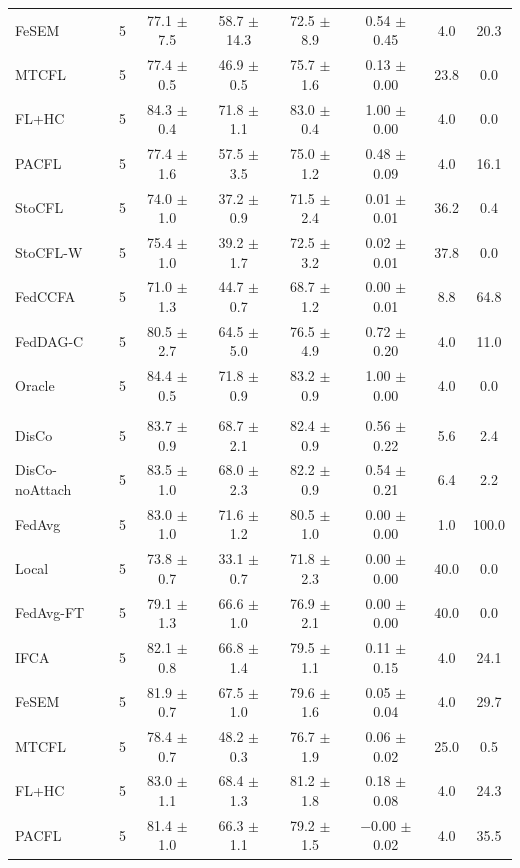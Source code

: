 {\begin{tabular}{l r c c c c c c}
FeSEM & 5 & 77.1 $\pm$ 7.5 & 58.7 $\pm$ 14.3 & 72.5 $\pm$ 8.9 & 0.54 $\pm$ 0.45 & 4.0 & 20.3 \\
MTCFL & 5 & 77.4 $\pm$ 0.5 & 46.9 $\pm$ 0.5 & 75.7 $\pm$ 1.6 & 0.13 $\pm$ 0.00 & 23.8 & 0.0 \\
FL+HC & 5 & 84.3 $\pm$ 0.4 & 71.8 $\pm$ 1.1 & 83.0 $\pm$ 0.4 & 1.00 $\pm$ 0.00 & 4.0 & 0.0 \\
PACFL & 5 & 77.4 $\pm$ 1.6 & 57.5 $\pm$ 3.5 & 75.0 $\pm$ 1.2 & 0.48 $\pm$ 0.09 & 4.0 & 16.1 \\
StoCFL & 5 & 74.0 $\pm$ 1.0 & 37.2 $\pm$ 0.9 & 71.5 $\pm$ 2.4 & 0.01 $\pm$ 0.01 & 36.2 & 0.4 \\
StoCFL-W & 5 & 75.4 $\pm$ 1.0 & 39.2 $\pm$ 1.7 & 72.5 $\pm$ 3.2 & 0.02 $\pm$ 0.01 & 37.8 & 0.0 \\
FedCCFA & 5 & 71.0 $\pm$ 1.3 & 44.7 $\pm$ 0.7 & 68.7 $\pm$ 1.2 & 0.00 $\pm$ 0.01 & 8.8 & 64.8 \\
FedDAG-C & 5 & 80.5 $\pm$ 2.7 & 64.5 $\pm$ 5.0 & 76.5 $\pm$ 4.9 & 0.72 $\pm$ 0.20 & 4.0 & 11.0 \\
Oracle & 5 & 84.4 $\pm$ 0.5 & 71.8 $\pm$ 0.9 & 83.2 $\pm$ 0.9 & 1.00 $\pm$ 0.00 & 4.0 & 0.0 \\
\addlinespace
\multicolumn{8}{l}{\textit{EMNIST label swap}} \\
DisCo & 5 & 83.7 $\pm$ 0.9 & 68.7 $\pm$ 2.1 & 82.4 $\pm$ 0.9 & 0.56 $\pm$ 0.22 & 5.6 & 2.4 \\
DisCo-noAttach & 5 & 83.5 $\pm$ 1.0 & 68.0 $\pm$ 2.3 & 82.2 $\pm$ 0.9 & 0.54 $\pm$ 0.21 & 6.4 & 2.2 \\
FedAvg & 5 & 83.0 $\pm$ 1.0 & 71.6 $\pm$ 1.2 & 80.5 $\pm$ 1.0 & 0.00 $\pm$ 0.00 & 1.0 & 100.0 \\
Local & 5 & 73.8 $\pm$ 0.7 & 33.1 $\pm$ 0.7 & 71.8 $\pm$ 2.3 & 0.00 $\pm$ 0.00 & 40.0 & 0.0 \\
FedAvg-FT & 5 & 79.1 $\pm$ 1.3 & 66.6 $\pm$ 1.0 & 76.9 $\pm$ 2.1 & 0.00 $\pm$ 0.00 & 40.0 & 0.0 \\
IFCA & 5 & 82.1 $\pm$ 0.8 & 66.8 $\pm$ 1.4 & 79.5 $\pm$ 1.1 & 0.11 $\pm$ 0.15 & 4.0 & 24.1 \\
FeSEM & 5 & 81.9 $\pm$ 0.7 & 67.5 $\pm$ 1.0 & 79.6 $\pm$ 1.6 & 0.05 $\pm$ 0.04 & 4.0 & 29.7 \\
MTCFL & 5 & 78.4 $\pm$ 0.7 & 48.2 $\pm$ 0.3 & 76.7 $\pm$ 1.9 & 0.06 $\pm$ 0.02 & 25.0 & 0.5 \\
FL+HC & 5 & 83.0 $\pm$ 1.1 & 68.4 $\pm$ 1.3 & 81.2 $\pm$ 1.8 & 0.18 $\pm$ 0.08 & 4.0 & 24.3 \\
PACFL & 5 & 81.4 $\pm$ 1.0 & 66.3 $\pm$ 1.1 & 79.2 $\pm$ 1.5 & $-$0.00 $\pm$ 0.02 & 4.0 & 35.5 \\

\end{tabular}}
